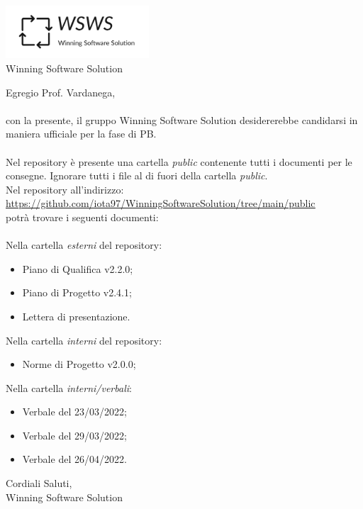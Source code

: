 \documentclass[a4paper, 12pt]{letter}
\begin{document}
\begin{center}
\includegraphics[width=0.4\textwidth]{WSWS-logos_transparent_crop}\\
{\Large Winning Software Solution}\\[24pt]
\end{center}
Egregio Prof. Vardanega,\\\\
con la presente, il gruppo Winning Software Solution desidererebbe candidarsi in maniera ufficiale
per la fase di PB.\\\\
Nel repository è presente una cartella \textit{public} contenente tutti i documenti per le consegne. Ignorare tutti i file
al di fuori della cartella \textit{public}.\\
Nel repository all'indirizzo: \\
\href{https://github.com/iota97/WinningSoftwareSolution/tree/main/public}{\underline{https://github.com/iota97/WinningSoftwareSolution/tree/main/public}}\\ 
potrà trovare i seguenti documenti:\\\\

Nella cartella \textit{esterni} del repository:
\begin{itemize}
\item Piano di Qualifica v2.2.0;
\item Piano di Progetto v2.4.1;
\item Lettera di presentazione.
\end{itemize}
Nella cartella \textit{interni} del repository:
\begin{itemize}
    \item Norme di Progetto v2.0.0;
\end{itemize}

Nella cartella \textit{interni/verbali}:
\begin{itemize}
    \item Verbale del 23/03/2022;
    \item Verbale del 29/03/2022;
    \item Verbale del 26/04/2022.
\end{itemize}
\begin{flushright}
Cordiali Saluti,\\
Winning Software Solution
\end{flushright}
\end{document}
